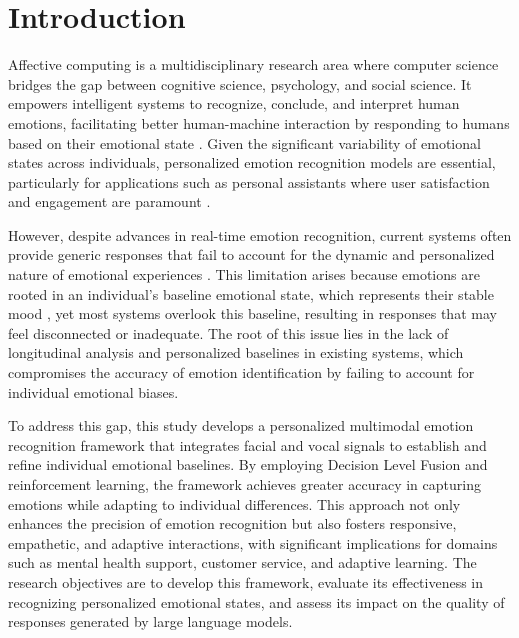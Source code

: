 \section{Introduction}
\par Affective computing is a multidisciplinary research area where computer science bridges the gap between cognitive science, psychology, and social science. It empowers intelligent systems to recognize, conclude, and interpret human emotions, facilitating better human-machine interaction by responding to
humans based on their emotional state \citep{picard2000affective}. Given the significant variability of emotional states across individuals, personalized emotion recognition models are essential, particularly for applications such as personal assistants where user satisfaction and engagement are paramount \citep{salama2020deep}.

\par However, despite advances in real-time emotion recognition, current systems often provide generic responses that fail to account for the dynamic and personalized nature of emotional experiences \citep{kim2024understanding}. This limitation arises because emotions are rooted in an individual's baseline emotional state, which represents their stable mood \citep{davidson1998affective}, yet most systems overlook this baseline, resulting in responses that may feel disconnected or inadequate. The root of this issue lies in the lack of longitudinal analysis and personalized baselines in existing systems, which compromises the accuracy of emotion identification by failing to account for individual emotional biases. 

\par To address this gap, this study develops a personalized multimodal emotion recognition framework that integrates facial and vocal signals to establish and refine individual emotional baselines. By employing Decision Level Fusion and reinforcement learning, the framework achieves greater accuracy in capturing emotions while adapting to individual differences. This approach not only enhances the precision of emotion recognition but also fosters responsive, empathetic, and adaptive interactions, with significant implications for domains such as mental health support, customer service, and adaptive learning. The research objectives are to develop this framework, evaluate its effectiveness in recognizing personalized emotional states, and assess its impact on the quality of responses generated by large language models.
